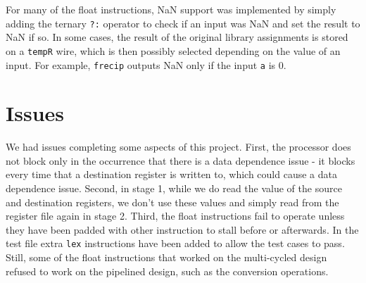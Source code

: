 \documentclass{sig-alternate-05-2015}
\begin{document}
For many of the float instructions, NaN support was implemented by simply adding the ternary \texttt{?:} operator to check if an input was NaN and set the result to NaN if so. In some cases, the result of the original library assignments is stored on a \texttt{tempR} wire, which is then possibly selected depending on the value of an input. For example, \texttt{frecip} outputs NaN only if the input \texttt{a} is 0.

\section{Issues}

We had issues completing some aspects of this project. First, the processor does not block only in the occurrence that there is a data dependence issue - it blocks every time that a destination register is written to, which could cause a data dependence issue. Second, in stage 1, while we do read the value of the source and destination registers, we don't use these values and simply read from the register file again in stage 2. Third, the float instructions fail to operate unless they have been padded with other instruction to stall before or afterwards. In the test file extra \texttt{lex} instructions have been added to allow the test cases to pass. Still, some of the float instructions that worked on the multi-cycled design refused to work on the pipelined design, such as the conversion operations.
\end{document}
